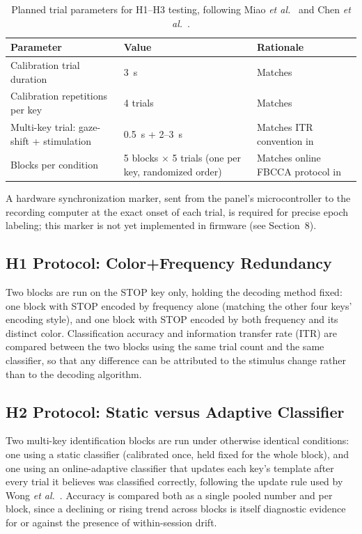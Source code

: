 \documentclass[11pt]{article}
\begin{document}
\begin{table}[htbp]
\centering
\caption{Planned trial parameters for H1--H3 testing, following Miao \textit{et al.}~\cite{miao2024cvepminimal} and Chen \textit{et al.}~\cite{chen2015pnas}.}
\label{tab:trial-params}
\small
\begin{tabular}{@{}p{5.8cm} p{2.5cm} p{4.3cm}@{}}
\toprule
\textbf{Parameter} & \textbf{Value} & \textbf{Rationale} \\
\midrule
Calibration trial duration & 3~s & Matches~\cite{miao2024cvepminimal} \\
Calibration repetitions per key & 4 trials & Matches~\cite{miao2024cvepminimal} \\
Multi-key trial: gaze-shift + stimulation & 0.5~s + 2--3~s & Matches ITR convention in~\cite{chen2015pnas} \\
Blocks per condition & 5 blocks $\times$ 5 trials (one per key, randomized order) & Matches online FBCCA protocol in~\cite{chen2015fbcca} \\
\bottomrule
\end{tabular}
\end{table}

A hardware synchronization marker, sent from the panel's microcontroller to the recording computer at the exact onset of each trial, is required for precise epoch labeling; this marker is not yet implemented in firmware (see Section~8).

\subsection{H1 Protocol: Color+Frequency Redundancy}

Two blocks are run on the STOP key only, holding the decoding method fixed: one block with STOP encoded by frequency alone (matching the other four keys' encoding style), and one block with STOP encoded by both frequency and its distinct color. Classification accuracy and information transfer rate (ITR) are compared between the two blocks using the same trial count and the same classifier, so that any difference can be attributed to the stimulus change rather than to the decoding algorithm.

\subsection{H2 Protocol: Static versus Adaptive Classifier}

Two multi-key identification blocks are run under otherwise identical conditions: one using a static classifier (calibrated once, held fixed for the whole block), and one using an online-adaptive classifier that updates each key's template after every trial it believes was classified correctly, following the update rule used by Wong \textit{et al.}~\cite{wong2022onlineadaptation}. Accuracy is compared both as a single pooled number and per block, since a declining or rising trend across blocks is itself diagnostic evidence for or against the presence of within-session drift.
\end{document}
